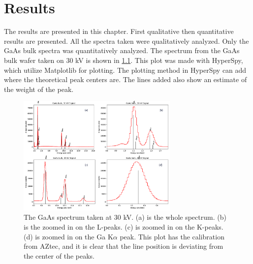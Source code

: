 \chapter{Results}
\label{chap:results}




The results are presented in this chapter.
First qualitative then quantitative results are presented.
All the spectra taken were qualitatively analyzed.
Only the GaAs bulk spectra was quantitatively analyzed.
The spectrum from the GaAs bulk wafer taken on 30 kV is shown in \cref{fig:GaAs30kV_HS}.
This plot was made with HyperSpy, which utilize Matplotlib for plotting.
The plotting method in HyperSpy can add where the theoretical peak centers are.
The lines added also show an estimate of the weight of the peak.


\begin{figure}[h]
    \centering
    \includegraphics[width=0.70\textwidth]{figures/GaAs30kV_HS.png}
    \caption{
        The GaAs spectrum taken at 30 kV.
        (a) is the whole spectrum.
        (b) is the zoomed in on the L-peaks.
        (c) is zoomed in on the K-peaks.
        (d) is zoomed in on the Ga K$\alpha$ peak.
        This plot has the calibration from AZtec, and it is clear that the line position is deviating from the center of the peaks.
    }
    \label{fig:GaAs30kV_HS}
\end{figure}





